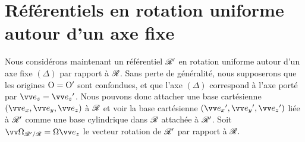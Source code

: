 \documentclass[12pt,fancy]{cours}
\begin{document}

\section{Référentiels en rotation uniforme autour d'un axe fixe}

Nous considérons maintenant un référentiel $\mathcal{R}'$ en rotation uniforme autour d'un axe fixe $(\Delta)$ par rapport à $\mathcal{R}$. Sans perte de généralité, nous supposerons que les origines $\rm O = O'$ sont confondues, et que l'axe $(\Delta)$ correspond à l'axe porté par $\ez=\ez'$. Nous pouvons donc attacher une base cartésienne $(\ex,\ey,\ez)$ à $\mathcal{R}$ et voir la base cartésienne $(\ex',\ey',\ez')$ liée à $\mathcal{R}'$ comme une base cylindrique dans $\mathcal{R}$ attachée à $\mathcal{R}'$. Soit $\OR = \Omega \ez$ le vecteur rotation de $\mathcal{R}'$ par rapport à $\mathcal{R}.$
\end{document}
